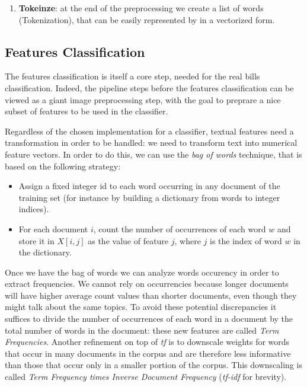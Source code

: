 \documentclass[10pt,twocolumn,letterpaper]{article}
\begin{document}
\begin{enumerate}
    they can be analysed as a single item, identified by the word's
    lemma, or dictionary form.\footnote{\href{
        https://en.wikipedia.org/wiki/Lemmatisation}{
        https://en.wikipedia.org/wiki/Lemmatisation}}. With
    this step, indeed, we tried to group words together in order to
    simplify the classification phase. However, we noticed that this
    step do not improve the performance and it can also produce worst
    results as it tries to group wrong words retrieved from the OCR.
  \item \textbf{Tokeinze}: at the end of the preprocessing we create a list of
    words (Tokenization), that can be easily represented by in a
    vectorized form.
\end{enumerate}

\subsection{Features Classification}
\label{subsec:classification}

The features classification is itself a core step, needed for the real
bills classification. Indeed, the pipeline steps before the features
classification can be viewed as a giant image preprocessing step, with
the goal to preprare a nice subset of features to be used in the
classifier.

Regardless of the chosen implementation for a classifier, textual
features need a transformation in order to be handled: we need to
transform text into numerical feature vectors. In order to do this, we
can use the \emph{bag of words} technique, that is based on the
following strategy:

\begin{itemize}
  \item Assign a fixed integer id to each word occurring in any
    document of the training set (for instance by building a
    dictionary from words to integer indices).
  \item For each document $i$, count the number of occurrences of each
    word $w$ and store it in $X[i, j]$ as the value of feature $j$,
    where $j$ is the index of word $w$ in the dictionary.
\end{itemize}

Once we have the bag of words we can analyze words occurency in order
to extract frequencies. We cannot rely on occurrencies because longer
documents will have higher average count values than shorter
documents, even though they might talk about the same topics. To avoid
these potential discrepancies it suffices to divide the number of
occurrences of each word in a document by the total number of words in
the document: these new features are called \emph{Term
  Frequencies}. Another refinement on top of \emph{tf} is to downscale
weights for words that occur in many documents in the corpus and are
therefore less informative than those that occur only in a smaller
portion of the corpus. This downscaling is called \emph{Term Frequency
  times Inverse Document Frequency} (\emph{tf-idf} for brevity).
\end{document}
